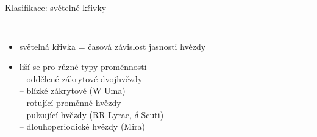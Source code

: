 \documentclass[aspectratio=43]{beamer}
\def\vs{\vspace{-2mm}}
\def\lend{\phantom{g}\vspace{1.5mm}\hrule\hrule}
\begin{document}
\begin{frame}{\vs Klasifikace: světelné křivky \lend}
\vspace{-12mm}
\begin{itemize}
    \small
    \item<1-> světelná křivka = časová závislost jasnosti hvězdy\\ \vspace{2.2mm}
    \item<2-> liší se pro různé typy proměnnosti\\ \vspace{1.6mm}
        -- oddělené zákrytové dvojhvězdy\\ \vspace{1.6mm}
        -- blízké zákrytové (W Uma)\\ \vspace{1.6mm}
        -- rotující proměnné hvězdy\\ \vspace{1.6mm}
        -- pulzující hvězdy (RR Lyrae, $\delta$ Scuti)\\ \vspace{1.6mm}
        -- dlouhoperiodické hvězdy (Mira)\\ \vspace{2.2mm}
\end{itemize}
\end{frame}
\end{document}
